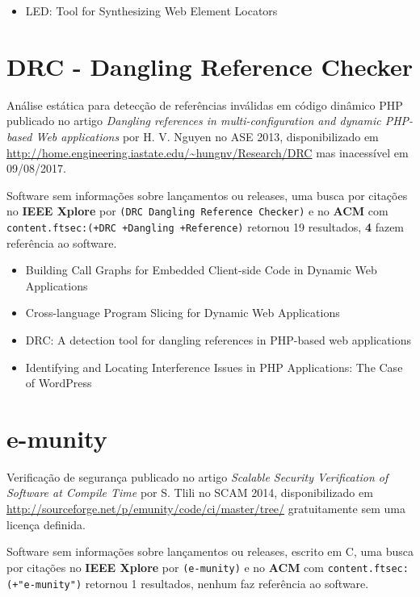 \begin{itemize}
\item LED: Tool for Synthesizing Web Element Locators
\end{itemize}

\section{DRC - Dangling Reference Checker}

Análise estática para detecção de referências inválidas em código dinâmico PHP
publicado no artigo {\it Dangling references in multi-configuration and dynamic PHP-based Web applications}
por H. V. Nguyen
no ASE 2013,
disponibilizado em \url{http://home.engineering.iastate.edu/~hungnv/Research/DRC}
mas inacessível em 09/08/2017.

Software sem informações sobre lançamentos ou releases,
uma busca por citações no {\bf IEEE Xplore} por
\texttt{(DRC Dangling Reference Checker)}
e no {\bf ACM} com
\texttt{content.ftsec:(+DRC +Dangling +Reference)}
retornou
19 resultados,
{\bf 4} fazem referência ao software.

\begin{itemize}
\item Building Call Graphs for Embedded Client-side Code in Dynamic Web Applications
\item Cross-language Program Slicing for Dynamic Web Applications
\item DRC: A detection tool for dangling references in PHP-based web applications
\item Identifying and Locating Interference Issues in PHP Applications: The Case of WordPress
\end{itemize}

\section{e-munity}

Verificação de segurança
publicado no artigo {\it Scalable Security Verification of Software at Compile Time}
por S. Tlili
no SCAM 2014,
disponibilizado em \url{http://sourceforge.net/p/emunity/code/ci/master/tree/}
gratuitamente
sem uma licença definida.

Software sem informações sobre lançamentos ou releases,
escrito em C,
uma busca por citações no {\bf IEEE Xplore} por
\texttt{(e-munity)}
e no {\bf ACM} com
\texttt{content.ftsec:(+"e-munity")}
retornou
1 resultados,
nenhum faz referência ao software.


